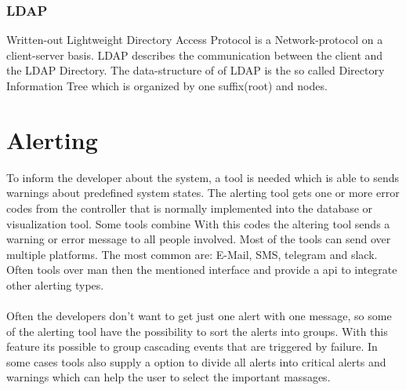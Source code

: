 \subsubsection{LDAP}
Written-out Lightweight Directory Access Protocol is a Network-protocol on a client-server basis. LDAP describes the communication between the client and the LDAP Directory. The data-structure of of LDAP is the so called Directory Information Tree which is organized by one suffix(root) and nodes.  
 


\section{Alerting}
To inform the developer about the system, a tool is needed which is able to sends warnings about predefined system states.
The alerting tool gets one or more error codes from the controller that is normally implemented into the database or visualization tool. Some tools combine With this codes the altering tool sends a warning or error message to all people involved. Most of the tools can send over multiple platforms. The most common are: E-Mail, SMS, telegram and slack. Often tools over man then the mentioned interface and provide a api to integrate other alerting types.\\
\\
Often the developers don’t want to get just one alert with one message, so some of the alerting tool have the possibility to sort the alerts into groups. With this feature its possible to group cascading events that are triggered by failure. In some cases tools also supply a option to divide all alerts into critical alerts and warnings which can help the user to select the important massages.  




\blinddocument
